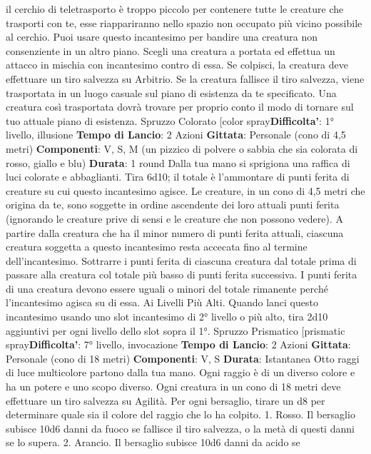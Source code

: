 \begin{multicols}{2}
il cerchio di teletrasporto è troppo piccolo per contenere
tutte le creature che trasporti con te, esse riappariranno
nello spazio non occupato più vicino possibile al
cerchio.
Puoi usare questo incantesimo per bandire una
creatura non consenziente in un altro piano. Scegli una
creatura a portata ed effettua un attacco in mischia con
incantesimo contro di essa. Se colpisci, la creatura
deve effettuare un tiro salvezza su Arbitrio. Se la
creatura fallisce il tiro salvezza, viene trasportata in un
luogo casuale sul piano di esistenza da te specificato.
Una creatura così trasportata dovrà trovare per proprio
conto il modo di tornare sul tuo attuale piano di
esistenza.
Spruzzo Colorato
[color spray\textbf{Difficolta'}:
1° livello, illusione
\textbf{Tempo di Lancio}: 2 Azioni
\textbf{Gittata}: Personale (cono di 4,5 metri)
\textbf{Componenti}: V, S, M (un pizzico di polvere o sabbia
che sia colorata di rosso, giallo e blu)
\textbf{Durata}: 1 round
Dalla tua mano si sprigiona una raffica di luci colorate e
abbaglianti. Tira 6d10; il totale è l’ammontare di punti
ferita di creature su cui questo incantesimo agisce. Le
creature, in un cono di 4,5 metri che origina da te, sono
soggette in ordine ascendente dei loro attuali punti
ferita (ignorando le creature prive di sensi e le creature
che non possono vedere).
A partire dalla creatura che ha il minor numero di punti
ferita attuali, ciascuna creatura soggetta a questo
incantesimo resta accecata fino al termine
dell’incantesimo. Sottrarre i punti ferita di ciascuna
creatura dal totale prima di passare alla creatura col
totale più basso di punti ferita successiva. I punti ferita
di una creatura devono essere uguali o minori del totale
rimanente perché l’incantesimo agisca su di essa.
Ai Livelli Più Alti. Quando lanci questo incantesimo
usando uno slot incantesimo di 2° livello o più alto, tira
2d10 aggiuntivi per ogni livello dello slot sopra il 1°.
Spruzzo Prismatico
[prismatic spray\textbf{Difficolta'}:
7° livello, invocazione
\textbf{Tempo di Lancio}: 2 Azioni
\textbf{Gittata}: Personale (cono di 18 metri)
\textbf{Componenti}: V, S
\textbf{Durata}: Istantanea
Otto raggi di luce multicolore partono dalla tua mano.
Ogni raggio è di un diverso colore e ha un potere e uno
scopo diverso. Ogni creatura in un cono di 18 metri
deve effettuare un tiro salvezza su Agilità. Per ogni
bersaglio, tirare un d8 per determinare quale sia il
colore del raggio che lo ha colpito.
1. Rosso. Il bersaglio subisce 10d6 danni da fuoco se
fallisce il tiro salvezza, o la metà di questi danni se lo
supera.
2. Arancio. Il bersaglio subisce 10d6 danni da acido se

\end{multicols}
